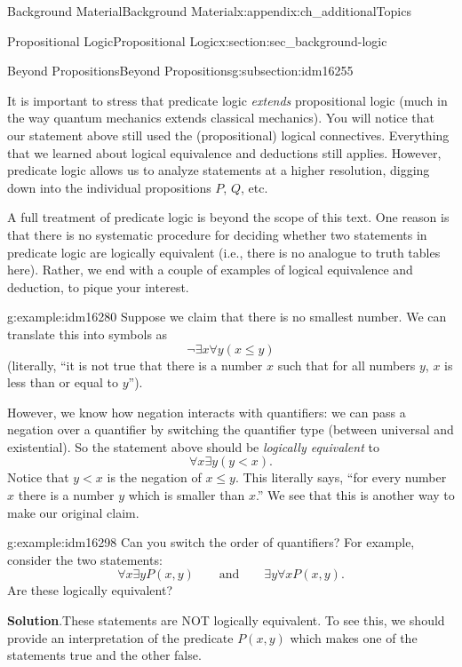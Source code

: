 \documentclass[oneside,10pt,]{book}
\numberwithin{equation}{chapter}
\newcommand{\lt}{<}
\begin{document}
\begin{appendixptx}{Background Material}{}{Background Material}{}{}{x:appendix:ch_additionalTopics}
\begin{sectionptx}{Propositional Logic}{}{Propositional Logic}{}{}{x:section:sec_background-logic}
\begin{subsectionptx}{Beyond Propositions}{}{Beyond Propositions}{}{}{g:subsection:idm16255}
\par
It is important to stress that predicate logic \emph{extends} propositional logic (much in the way quantum mechanics extends classical mechanics).  You will notice that our statement above still used the (propositional) logical connectives.  Everything that we learned about logical equivalence and deductions still applies.  However, predicate logic allows us to analyze statements at a higher resolution, digging down into the individual propositions \(P\), \(Q\), etc.%
\par
A full treatment of predicate logic is beyond the scope of this text.  One reason is that there is no systematic procedure for deciding whether two statements in predicate logic are logically equivalent (i.e., there is no analogue to truth tables here).  Rather, we end with a couple of examples of logical equivalence and deduction, to pique your interest.%
\begin{example}{}{g:example:idm16280}%
Suppose we claim that there is no smallest number.  We can translate this into symbols as%
\begin{equation*}
\neg \exists x \forall y (x \le y)
\end{equation*}
(literally, ``it is not true that there is a number \(x\) such that for all numbers \(y\), \(x\) is less than or equal to \(y\)'').%
\par
However, we know how negation interacts with quantifiers: we can pass a negation over a quantifier by switching the quantifier type (between universal and existential).  So the statement above should be \emph{logically equivalent} to%
\begin{equation*}
\forall x \exists y (y \lt x).
\end{equation*}
Notice that \(y \lt x\) is the negation of \(x \le y\).  This literally says, ``for every number \(x\) there is a number \(y\) which is smaller than \(x\).''  We see that this is another way to make our original claim.%
\end{example}
\begin{example}{}{g:example:idm16298}%
Can you switch the order of quantifiers? For example, consider the two statements:%
\begin{equation*}
\forall x \exists y P(x,y) \qquad \mathrm{ and } \qquad \exists y \forall x P(x,y).
\end{equation*}
Are these logically equivalent?%
\par\smallskip%
\noindent\textbf{Solution}.\hypertarget{g:solution:idm16302}{}\quad{}These statements are NOT logically equivalent. To see this, we should provide an interpretation of the predicate \(P(x,y)\) which makes one of the statements true and the other false.%

\end{example}
\end{subsectionptx}
\end{sectionptx}
\end{appendixptx}
\end{document}
